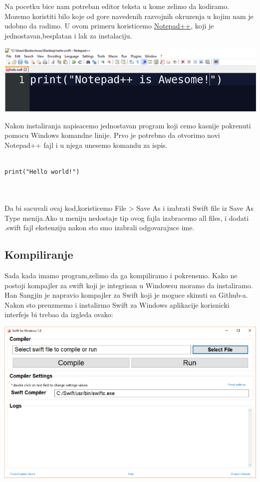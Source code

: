 \documentclass[a4paper]{article}
\begin{document}
Na pocetku bice nam potreban editor teksta u kome zelimo da kodiramo. Mozemo koristiti bilo koje od gore navedenih razvojnih okruzenja u kojim nam je udobno da radimo. 
U ovom primeru koristicemo \href{https://notepad-plus-plus.org/download/v7.6.4.html}{Notepad++}, koji je jednostavan,besplatan i lak za instalaciju.
\vspace{5mm}

\includegraphics[scale=0.5]{notepadpp.png}
\vspace{5mm}

Nakon instaliranja napisacemo jednostavan program koji cemo kasnije pokrenuti pomocu Windows komandne linije. Prvo je potrebno da otvorimo novi Notepad++ fajl i u njega unesemo komandu za ispis.

\begin{lstlisting}[caption={},frame=single, label=simple]

print("Hello world!")



\end{lstlisting}
\vspace{5mm}
Da bi sacuvali ovaj kod,koristicemo File > Save As i izabrati Swift file iz Save As Type menija.Ako u meniju nedostaje tip ovog fajla izabracemo all files, i dodati .swift fajl ekstenziju nakon sto smo izabrali odgovarajuce ime.


\subsection{Kompiliranje}
\label{subsec:podnaslovKompiliranje}

Sada kada imamo program,zelimo da ga kompiliramo i pokrenemo. Kako ne postoji kompajler za swift koji je integrisan u Windowsu moramo da instaliramo. Han Sangjin je napravio kompajler za Swift koji je moguce skinuti sa Github-a. Nakon sto preuzmemo i instalirmo Swift za Windows aplikacije korisnicki interfejs bi trebao da izgleda ovako:

\includegraphics[scale=0.4]{swift-win.png}
\vspace{5mm}
\end{document}
